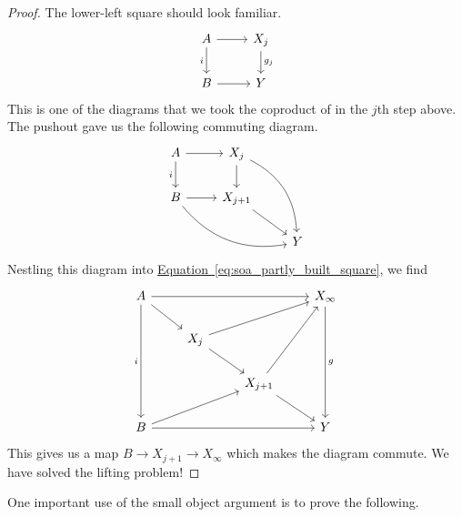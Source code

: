 \documentclass[main.tex]{subfiles}
\begin{document}
\begin{proof}
  The lower-left square should look familiar.
  \begin{equation*}
    \begin{tikzcd}
      A
      \arrow[r]
      \arrow[d, swap, "i"]
      & X_{j}
      \arrow[d, "g_{j}"]
      \\
      B
      \arrow[r]
      & Y
    \end{tikzcd}
  \end{equation*}
  This is one of the diagrams that we took the coproduct of in the $j$th step above. The pushout gave us the following commuting diagram.
  \begin{equation*}
    \begin{tikzcd}
      A
      \arrow[r]
      \arrow[d, swap, "i"]
      & X_{j}
      \arrow[ddr, bend left]
      \arrow[d, swap]
      \\
      B
      \arrow[r]
      \arrow[rrd, bend right]
      & X_{j+1}
      \arrow[rd]
      \\
      & & Y
    \end{tikzcd}
  \end{equation*}
  Nestling this diagram into \hyperref[eq:soa_partly_built_square]{Equation~\ref*{eq:soa_partly_built_square}}, we find
  \begin{equation*}
    \begin{tikzcd}
      A
      \arrow[rrr]
      \arrow[ddd, swap, "i"]
      \arrow[rd]
      &&& X_{\infty}
      \arrow[ddd, "g"]
      \\
      & X_{j}
      \arrow[urr]
      \arrow[dr]
      \\
      && X_{j+1}
      \arrow[uur]
      \arrow[rd]
      \\
      B
      \arrow[rrr]
      \arrow[urr]
      &&& Y
    \end{tikzcd}
  \end{equation*}
  This gives us a map $B \to X_{j+1} \to X_{\infty}$ which makes the diagram commute. We have solved the lifting problem!
\end{proof}

One important use of the small object argument is to prove the following.
\end{document}
